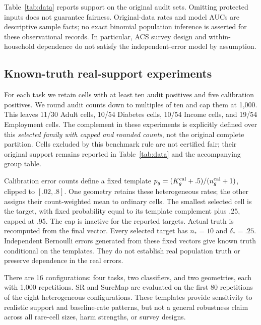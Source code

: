 \documentclass[Afour,sageh,times,doublespace]{sagej}
\begin{document}
Table~\ref{tab:data} reports support on the original audit sets. Omitting protected inputs does not guarantee fairness. Original-data rates and model AUCs are descriptive sample facts; no exact binomial population inference is asserted for these observational records. In particular, ACS survey design and within-household dependence do not satisfy the independent-error model by assumption.


\subsection{Known-truth real-support experiments}
For each task we retain cells with at least ten audit positives and five calibration positives. We round audit counts down to multiples of ten and cap them at 1,000. This leaves 11/30 Adult cells, 10/54 Diabetes cells, 10/54 Income cells, and 19/54 Employment cells. The complement in these experiments is explicitly defined over this \emph{selected family with capped and rounded counts}, not the original complete partition. Cells excluded by this benchmark rule are not certified fair; their original support remains reported in Table~\ref{tab:data} and the accompanying group table.

Calibration error counts define a fixed template $p_g=(K_g^{\rm cal}+.5)/(n_g^{\rm cal}+1)$, clipped to $[.02,.8]$. One geometry retains these heterogeneous rates; the other assigns their count-weighted mean to ordinary cells. The smallest selected cell is the target, with fixed probability equal to its template complement plus .25, capped at .95. The cap is inactive for the reported targets. Actual truth is recomputed from the final vector. Every selected target has $n_*=10$ and $\delta_*=.25$. Independent Bernoulli errors generated from these fixed vectors give known truth conditional on the templates. They do not establish real population truth or preserve dependence in the real errors.

There are 16 configurations: four tasks, two classifiers, and two geometries, each with 1,000 repetitions. SR and SureMap are evaluated on the first 80 repetitions of the eight heterogeneous configurations. These templates provide sensitivity to realistic support and baseline-rate patterns, but not a general robustness claim across all rare-cell sizes, harm strengths, or survey designs.
\end{document}
